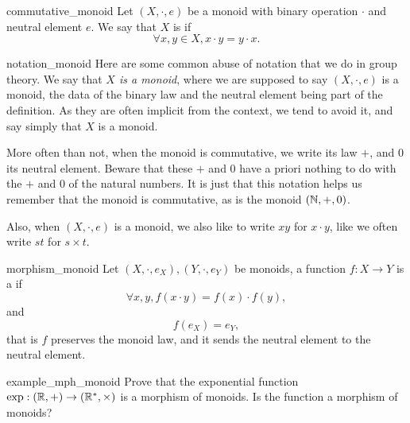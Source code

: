 \begin{cdef}{}{commutative_monoid}
    Let \( (X, \cdot, e) \) be a monoid with binary operation \( \cdot \) and neutral element \( e \). We say that \( X \) is  if 
    \begin{equation*}
        \forall x,y \in X, x \cdot y = y \cdot x.
    \end{equation*} 
\end{cdef}

\begin{crem}{}{notation_monoid}
    Here are some common abuse of notation that we do in group theory. We say that \textit{\( X \) is a monoid}, where we are supposed to say \( (X, \cdot, e) \) is a monoid, the data of the binary law and the neutral element being part of the definition. As they are often implicit from the context, we tend to avoid it, and say simply that \( X \) is a monoid.

    More often than not, when the monoid is commutative, we write its law \( + \), and \( 0 \) its neutral element. Beware that these \( + \) and \( 0 \) have a priori nothing to do with the \( + \) and \( 0 \) of the natural numbers. It is just that this notation helps us remember that the monoid is commutative, as is the monoid \( (\mathbb{N}, +, 0) \).
    
    Also, when \( (X, \cdot, e) \) is a monoid, we also like to write \( xy \) for \( x \cdot y \), like we often write \( st \) for \( s \times t \).    
\end{crem}

\begin{cdef}{}{morphism_monoid}
    Let \( (X, \cdot, e_X), (Y, \cdot, e_Y) \) be monoids, a function \( f : X \to Y \) is a  if
    \begin{equation*}
        \forall x, y, f(x \cdot y) = f(x) \cdot f(y),
    \end{equation*}
    and 
    \begin{equation*}
        f(e_X) = e_Y,
    \end{equation*}
    that is \( f \) preserves the monoid law, and it sends the neutral element to the neutral element. 
\end{cdef}

\begin{cex}{}{example_mph_monoid}
    Prove that the exponential function \( \exp : (\mathbb{R}, +) \to (\mathbb{R}^*, \times) \) is a morphism of monoids. Is the function 
    a morphism of monoids?
\end{cex}

